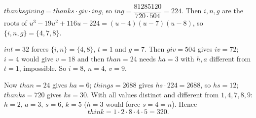 $thanksgiving=thanks\cdot giv\cdot ing$, so $ing=\dfrac{81285120}{720\cdot504}=224$. Then $i,n,g$ are the roots of $u^3-19u^2+116u-224=(u-4)(u-7)(u-8)$, so $\{i,n,g\}=\{4,7,8\}$.

$int=32$ forces $\{i,n\}=\{4,8\}$, $t=1$ and $g=7$. Then $giv=504$ gives $iv=72$; $i=4$ would give $v=18$ and then $than=24$ needs $ha=3$ with $h,a$ different from $t=1$, impossible. So $i=8$, $n=4$, $v=9$.

Now $than=24$ gives $ha=6$; $things=2688$ gives $hs\cdot224=2688$, so $hs=12$; $thanks=720$ gives $ks=30$. With all values distinct and different from $1,4,7,8,9$: $h=2$, $a=3$, $s=6$, $k=5$ ($h=3$ would force $s=4=n$). Hence
\[think=1\cdot2\cdot8\cdot4\cdot5=\boxed{320}.\]
